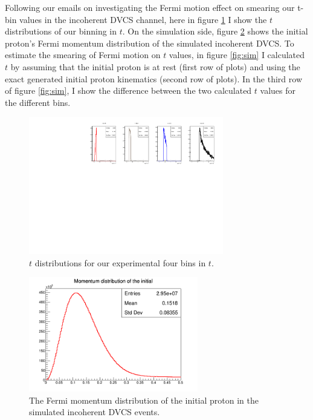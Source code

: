 \documentclass[a4paper,11pt,twoside]{article}
\date{\today}
\begin{document}
\title{}
\maketitle

Following our emails on investigating the Fermi motion effect on smearing our 
t-bin values in the incoherent DVCS channel, here in figure \ref{fig:exp} I 
show the $t$ distributions of our binning in $t$. On the simulation side, 
figure \ref{fig:fermi} shows the initial proton's Fermi momentum distribution 
of the simulated incoherent DVCS. To estimate the smearing of Fermi motion on 
$t$ values, in figure \ref{fig:sim} I calculated $t$ by assuming that the 
initial proton is at rest (first row of plots) and using the exact generated 
initial proton kinematics (second row of plots). In the third row of figure 
\ref{fig:sim}, I show the difference between the two calculated $t$ values for 
the different bins.  

\begin{figure}[h!]
   \centering
\includegraphics[height=6.0cm]{figs/t_n_Incoh.pdf}
\caption{$t$ distributions for our experimental four bins in $t$.}
\label{fig:exp}
\end{figure}

\begin{figure}[h!]
   \centering
\includegraphics[height=5.0cm]{figs/sim_Fermi_mom.png}
\caption{The Fermi momentum distribution of the initial proton in the simulated 
   incoherent DVCS events.
   }
\label{fig:fermi}
\end{figure}
\end{document}
